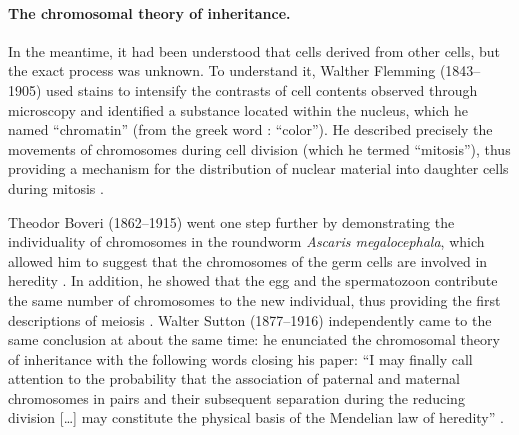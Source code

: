 






\paragraph{The chromosomal theory of inheritance.}
In the meantime, it had been understood that cells derived from other cells, but the exact process was unknown. 
To understand it, Walther Flemming (1843--1905) used stains to intensify the contrasts of cell contents observed through microscopy and identified a substance located within the nucleus, which he named “chromatin” (from the greek word \textit{\textchi\textrho\textomega\textmu\textalpha}: “color”).
He described precisely the movements of chromosomes during cell division (which he termed “mitosis”), thus providing a mechanism for the distribution of nuclear material into daughter cells during mitosis \citep{flemming1879contributions}.

Theodor Boveri (1862--1915) went one step further by demonstrating the individuality of chromosomes in the roundworm \textit{Ascaris megalocephala}, which allowed him to suggest that the chromosomes of the germ cells are involved in heredity \citep{boveri1888zellen}.
In addition, he showed that the egg and the spermatozoon contribute the same number of chromosomes to the new individual, thus providing the first descriptions of meiosis \citep{boveri1890zellen}.
Walter Sutton (1877--1916) independently came to the same conclusion at about the same time: he enunciated the chromosomal theory of inheritance with the following words closing his  paper: “I may finally call attention to the probability that the association of paternal and maternal chromosomes in pairs and their subsequent separation during the reducing division […] may constitute the physical basis of the Mendelian law of heredity” \citep{sutton1902morphology}.

